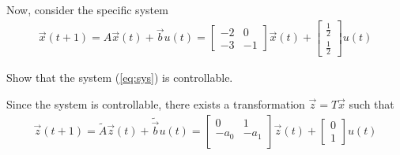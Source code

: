 \begin{enumerate}
\end{enumerate}

Now, consider the specific system
\begin{align} \label{eq:sys}
\vec{x}(t+1) = A \vec{x}(t) + \vec{b} u(t) = \begin{bmatrix}
-2 & 0 \\
-3 & -1
\end{bmatrix} \vec{x}(t) + 
\begin{bmatrix}
\frac{1}{2} \\
\frac{1}{2}
\end{bmatrix} u(t)
\end{align}

\begin{enumerate}[resume]
\qitem Show that the system (\ref{eq:sys}) is controllable.

\end{enumerate}

Since the system is controllable,
there exists a transformation $\vec{z} = T\vec{x}$ such that
\begin{align} \label{eq:canonical}
\vec{z}(t+1) = \widetilde{A}\vec{z}(t) + \widetilde{\vec{b}} u(t) = \begin{bmatrix}
0 & 1  \\
 -a_0 & -a_1 \\
\end{bmatrix} 
\vec{z}(t) +
\begin{bmatrix}
0  \\ 1
\end{bmatrix}
u(t)
\end{align}

